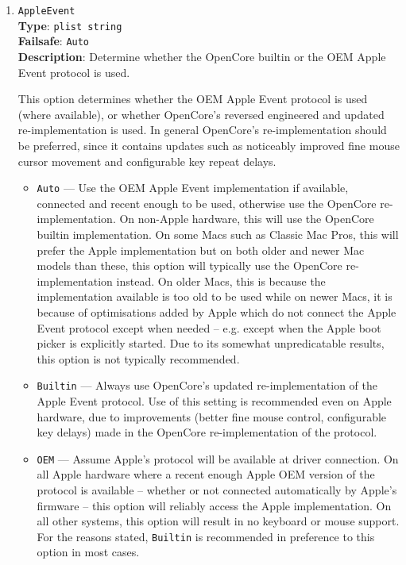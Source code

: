 \documentclass[]{article}
\providecommand{\tightlist}{%
  \setlength{\itemsep}{0pt}\setlength{\parskip}{0pt}}
\begin{document}
\begin{enumerate}

  \item
  \texttt{AppleEvent}\\
  \textbf{Type}: \texttt{plist\ string}\\
  \textbf{Failsafe}: \texttt{Auto}\\
  \textbf{Description}: Determine whether the OpenCore builtin or the OEM Apple Event protocol is used.

  This option determines whether the OEM Apple Event protocol is used (where available), or
  whether OpenCore's reversed engineered and updated re-implementation is used. In general
  OpenCore's re-implementation should be preferred, since it contains updates such as noticeably
  improved fine mouse cursor movement and configurable key repeat delays.

  \begin{itemize}
  \tightlist
  \item \texttt{Auto} --- Use the OEM Apple Event implementation if available, connected and
  recent enough to be used, otherwise use the OpenCore re-implementation.
  On non-Apple hardware, this will use the OpenCore builtin implementation.
  On some Macs such as Classic Mac Pros, this will prefer the Apple implementation but on both older and
  newer Mac models than these, this option will typically use the OpenCore re-implementation instead.
  On older Macs, this is because the implementation available is too old to be used while on newer Macs,
  it is because of optimisations added by Apple which do not connect the Apple Event protocol
  except when needed -- e.g. except when the Apple boot picker is explicitly started.
  Due to its somewhat unpredicatable results, this option is not typically recommended.
  \item \texttt{Builtin} ---  Always use OpenCore's updated re-implementation of the Apple Event protocol.
  Use of this setting is recommended even on Apple hardware, due to
  improvements (better fine mouse control, configurable key delays) made in the OpenCore re-implementation
  of the protocol.
  \item \texttt{OEM} --- Assume Apple's protocol will be available at driver connection. On all Apple hardware
  where a recent enough Apple OEM version of the protocol is available -- whether or not connected automatically
  by Apple's firmware -- this option will reliably access the Apple implementation. On all other systems, this
  option will result in no keyboard or mouse support. For the reasons stated, \texttt{Builtin} is recommended in
  preference to this option in most cases.
  \end{itemize}


\end{enumerate}
\end{document}
